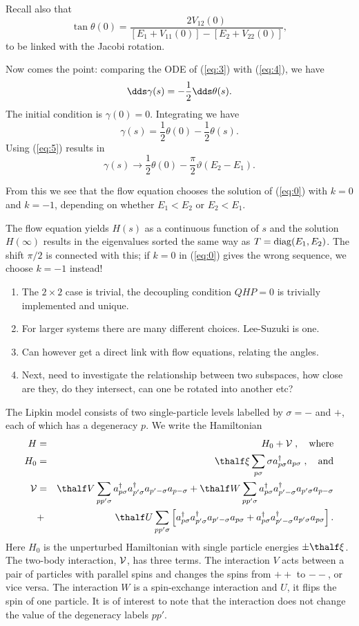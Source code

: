 Recall also that 
\[ \tan \theta(0) = \frac{2 V_{12}(0) }{[E_1 + V_{11}(0)]- [E_2 +
  V_{22}(0)]},
\]
to be linked with the Jacobi  rotation.

Now comes the point: comparing the  ODE of (\ref{eq:3}) with 
(\ref{eq:4}), we have
\[ \dds \gamma(s) = -\frac{1}{2} \dds \theta(s). \]
The initial condition is 
$\gamma(0) = 0$. Integrating we have
\[ \gamma(s) = \frac{1}{2}\theta(0) - \frac{1}{2}\theta(s). \]
Using (\ref{eq:5}) results in 
\[ \gamma(s) \rightarrow \frac{1}{2}\theta(0) -
\frac{\pi}{2}\vartheta(E_2-E_1). \]

From this we see that the flow equation chooses the solution of (\ref{eq:0}) with
$k=0$ and $k=-1$, depending on whether  $E_1<E_2$ or
$E_2<E_1$.

The flow equation yields $H(s)$ as a continuous function of $s$ and the solution
$H(\infty)$ results in the eigenvalues sorted the same way as
$T = \mathrm{diag}(E_1,E_2)$. The shift $\pi/2$ is connected with this; if $k=0$ in 
(\ref{eq:0}) gives the wrong sequence, we choose $k=-1$ instead!
    \begin{enumerate}
\item The $2\times 2$ case is trivial, the decoupling condition $QHP=0$  is trivially implemented and 
unique.  
\item For larger systems there are many different choices. Lee-Suzuki is one.
\item Can however get a direct link with flow equations, relating the angles.
\item Next, need to investigate the relationship between two subspaces, how close are they, do they 
intersect, can one be rotated into another etc?  
    \end{enumerate}
The Lipkin model consists of two single-particle levels
labelled by $\sigma=-$ and $+$, each of which has a degeneracy $p$. We write
the Hamiltonian
\begin{eqnarray}
H&=& H_0+{\cal V}\;,\quad{\rm where}\nonumber\\
H_0&=&\thalf\xi\sum_{p\sigma}{\sigma}a_{p\sigma}^{\dagger}a_{p\sigma}\;,
\quad{\rm and}\nonumber\\
{\cal V}&=&\thalf V\sum_{pp'\sigma}a^{\dagger}_{p\sigma}
a^{\dagger}_{p'\sigma}a_{p'-\sigma}a_{p-\sigma}+ 
\thalf W\sum_{pp'\sigma}a^{\dagger}_{p\sigma}a_{p'-\sigma}^{\dagger}
a_{p'\sigma}a_{p-\sigma}  \nonumber\\
&+&\thalf U\sum_{pp'\sigma}\left[a^{\dagger}_{p\sigma}
a_{p'\sigma}^{\dagger}
a_{p'-\sigma}a_{p\sigma}+a^{\dagger}_{p\sigma}a_{p'-\sigma}^{\dagger}
a_{p'\sigma}a_{p\sigma}\right].\nonumber
\end{eqnarray}
Here $H_0$ is the unperturbed  Hamiltonian with single particle energies
$\pm\thalf\xi$. The two-body interaction, ${\cal V}$, has three terms. The
interaction $V$ acts between a pair of particles with parallel spins and
changes the spins from $++$ to $--$, or vice versa. The interaction $W$
is a spin-exchange interaction and $U$, it flips the spin of one particle.
It is of interest to note that the interaction does not change the value of
the degeneracy labels $pp'$.


